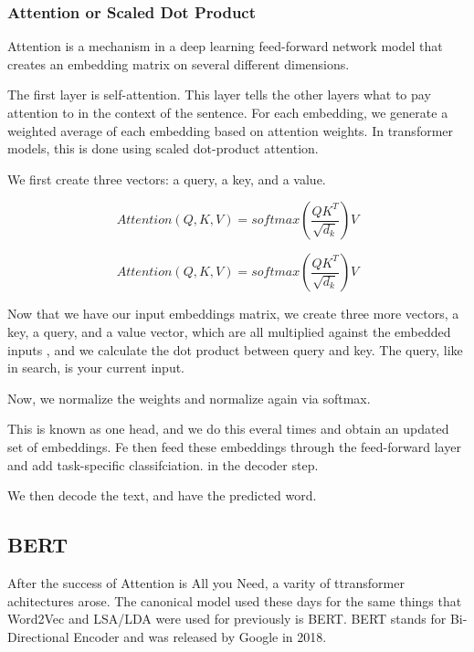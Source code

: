 \documentclass[draft, 11pt]{diazessay} %
\begin{document}
\subsubsection{Attention or Scaled Dot Product}

Attention is a mechanism in a deep learning feed-forward network model that creates an embedding matrix on several different dimensions\citep{amatriain2023transformer}. 

The first layer is self-attention. This layer tells the other layers what to pay attention to in the context of the sentence.  For each embedding, we generate a weighted average of each embedding based on attention weights. In transformer models, this is done using scaled dot-product attention. 

We first create three vectors:  a query, a key, and a value. 

\begin{equation}
Attention(Q, K, V) = softmax(\frac{QK^T}{\sqrt{d_k}})V
\end{equation}

\begin{equation}
Attention(Q, K, V) = softmax(\frac{QK^T}{\sqrt{d_k}})V
\end{equation}


Now that we have our input embeddings matrix, we create three more vectors, a key, a query, and a value vector, which are all multiplied against the embedded inputs , and we calculate the dot product between query and key. The query, like in search,  is your current input. 

Now, we normalize the weights and normalize again via softmax.

This is known as one head, and we do this everal times and obtain an updated set of embeddings.  Fe then feed these embeddings through the feed-forward layer and add task-specific classifciation. in the decoder step. 

We then decode the text, and have the predicted word. 

\subsection{BERT}

After the success of Attention is All you Need, a varity of ttransformer achitectures arose. The canonical model used these days for the same things that Word2Vec and LSA/LDA were used for previously is BERT. BERT stands for Bi-Directional Encoder and was released by Google in 2018\citep{devlin2018bert}. 
\end{document}
